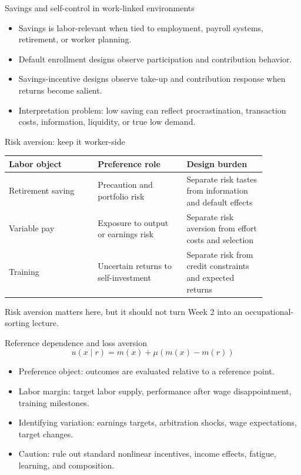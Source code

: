\documentclass[aspectratio=169,11pt]{beamer}
\begin{document}
\begin{frame}{Savings and self-control in work-linked environments}
\begin{itemize}
    \item Savings is labor-relevant when tied to employment, payroll systems, retirement, or worker planning.
    \item Default enrollment designs observe participation and contribution behavior.
    \item Savings-incentive designs observe take-up and contribution response when returns become salient.
    \item Interpretation problem: low saving can reflect procrastination, transaction costs, information, liquidity, or true low demand.
\end{itemize}
\end{frame}

\begin{frame}{Risk aversion: keep it worker-side}
\small
\begin{tabular}{p{0.30\linewidth} p{0.30\linewidth} p{0.27\linewidth}}
\toprule
Labor object & Preference role & Design burden \\
\midrule
Retirement saving & Precaution and portfolio risk & Separate risk tastes from information and default effects \\
Variable pay & Exposure to output or earnings risk & Separate risk aversion from effort costs and selection \\
Training & Uncertain returns to self-investment & Separate risk from credit constraints and expected returns \\
\bottomrule
\end{tabular}

\vspace{0.5em}
Risk aversion matters here, but it should not turn Week 2 into an occupational-sorting lecture.
\end{frame}

\begin{frame}{Reference dependence and loss aversion}
\[
u(x \mid r) = m(x) + \mu\!\left(m(x)-m(r)\right)
\]

\begin{itemize}
    \item Preference object: outcomes are evaluated relative to a reference point.
    \item Labor margin: target labor supply, performance after wage disappointment, training milestones.
    \item Identifying variation: earnings targets, arbitration shocks, wage expectations, target changes.
    \item Caution: rule out standard nonlinear incentives, income effects, fatigue, learning, and composition.
\end{itemize}
\end{frame}
\end{document}
